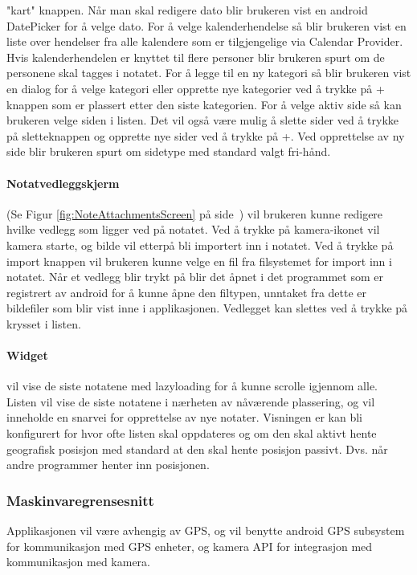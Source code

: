 \documentclass[a4paper, 12pt]{article}
\begin{document}
"kart" knappen. Når man skal redigere dato blir brukeren vist en android DatePicker for å velge dato. For å velge kalenderhendelse så blir brukeren vist en liste over hendelser fra alle kalendere som er tilgjengelige via Calendar Provider. Hvis kalenderhendelen er knyttet til flere personer blir brukeren spurt om de personene skal tagges i notatet. For å legge til en ny kategori så blir brukeren vist en dialog for å velge kategori eller opprette nye kategorier ved å trykke på + knappen som er plassert etter den siste kategorien. For å velge aktiv side så kan brukeren velge siden i listen. Det vil også være mulig å slette sider ved å trykke på sletteknappen og opprette nye sider ved å trykke på +. Ved opprettelse av ny side blir brukeren spurt om sidetype med standard valgt fri-hånd.

\paragraph{Notatvedleggskjerm} (Se Figur \ref{fig:NoteAttachmentsScreen} på side~\pageref{fig:NoteAttachmentsScreen}) vil brukeren kunne redigere hvilke vedlegg som ligger ved på notatet. Ved å trykke på kamera-ikonet vil kamera starte, og bilde vil etterpå bli importert inn i notatet. Ved å trykke på import knappen vil brukeren kunne velge en fil fra filsystemet for import inn i notatet. Når et vedlegg blir trykt på blir det åpnet i det programmet som er registrert av android for å kunne åpne den filtypen, unntaket fra dette er bildefiler som blir vist inne i applikasjonen. Vedlegget kan slettes ved å trykke på krysset i listen.

\paragraph{Widget} vil vise de siste notatene med lazyloading for å kunne scrolle igjennom alle. Listen vil vise de siste notatene i nærheten av nåværende plassering, og vil inneholde en snarvei for opprettelse av nye notater. Visningen er kan bli konfigurert for hvor ofte listen skal oppdateres og om den skal aktivt hente geografisk posisjon med standard at den skal hente posisjon passivt. Dvs. når andre programmer henter inn posisjonen.

\subsubsection{Maskinvaregrensesnitt}
Applikasjonen vil være avhengig av GPS, og vil benytte android GPS subsystem for kommunikasjon med GPS enheter, og kamera API for integrasjon med kommunikasjon med kamera.
\end{document}
